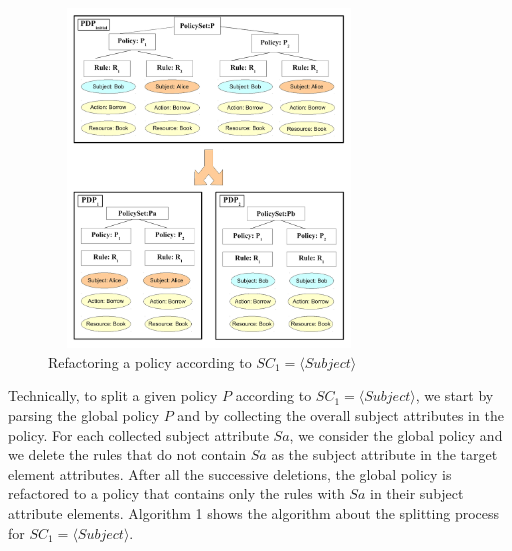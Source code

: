 \begin{figure}[!h]
\begin{center}
\includegraphics[width=8.5cm, height=9cm]{splitting}
\caption{Refactoring a policy according to $SC_{1}=\langle Subject\rangle$}
\label{splitting}
\end{center}
\end{figure}

Technically, to split a given policy $P$ according to $SC_{1}=\langle Subject\rangle$, we start by parsing the global policy $P$ 
and by collecting the overall subject attributes in the policy. For each collected subject attribute $Sa$, we consider the global policy and we 
delete the rules that do not contain $Sa$ as the subject attribute in the target element attributes. After all the successive deletions, the global 
policy is refactored to a policy that contains only the rules with $Sa$ in their subject attribute elements. 
Algorithm 1 shows the algorithm about the splitting process for $SC_{1}=\langle Subject\rangle$.

